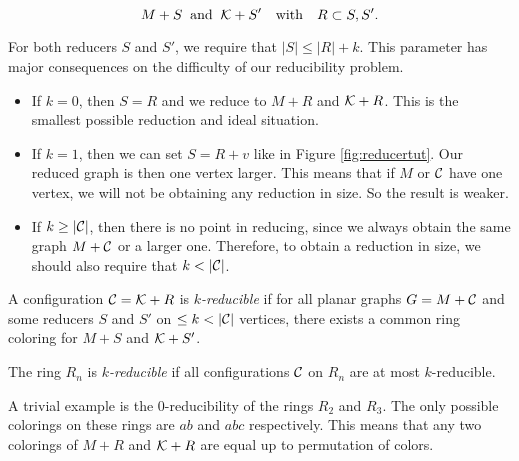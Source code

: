 \begin{equation}
    M+S \;\;\text{and}\;\; \mathcal{K}+S' \quad \text{with} \quad R \subset S,S'.
\end{equation}

For both reducers $S$ and $S'$, we require that $|S| \leq |R| + k$. This parameter has major consequences on the difficulty of our reducibility problem.

\begin{itemize}
    \item If $k=0$, then $S=R$ and we reduce to $M+R$ and $\mathcal{K}+R$. This is the smallest possible reduction and ideal situation.
    \item If $k=1$, then we can set $S=R+v$ like in Figure \ref{fig:reducertut}. Our reduced graph is then one vertex larger. This means that if $M$ or $\mathcal{C}$ have one vertex, we will not be obtaining any reduction in size. So the result is weaker.
    \item If $k \geq |\mathcal{C}|$, then there is no point in reducing, since we always obtain the same graph $M+\mathcal{C}$ or a larger one. Therefore, to obtain a reduction in size, we should also require that $k < |\mathcal{C}|$. 
\end{itemize}


\begin{definition}
    A configuration $\mathcal{C}=\mathcal{K}+R$ is \emph{$k$-reducible} if for all planar graphs $G=M+\mathcal{C}$ and some reducers $S$ and $S'$ on $\leq k < |\mathcal{C}|$ vertices, there exists a common ring coloring for $M+S$ and $\mathcal{K}+S'$.
\end{definition}
\begin{definition}
    The ring $R_n$ is \emph{$k$-reducible} if all configurations $\mathcal{C}$ on $R_n$ are at most $k$-reducible.
\end{definition}

A trivial example is the 0-reducibility of the rings $R_2$ and $R_3$. The only possible colorings on these rings are $ab$ and $abc$ respectively. This means that any two colorings of $M+R$ and $\mathcal{K} + R$ are equal up to permutation of colors.
